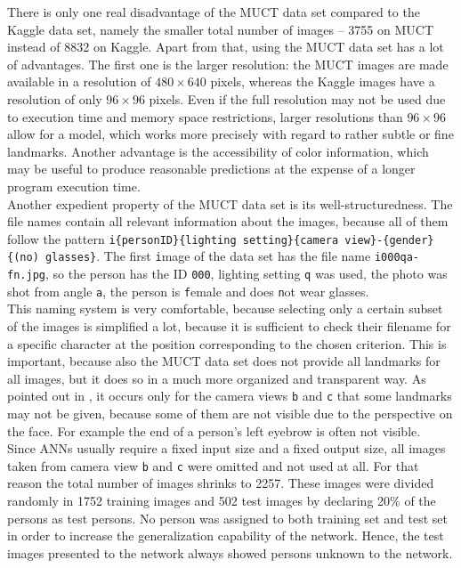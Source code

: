 \documentclass[11pt, a4paper]{article}
\begin{document}
There is only one real disadvantage of the \ac{MUCT} data set compared to the Kaggle data set, namely the smaller total number of images -- 3755 on \ac{MUCT} instead of 8832 on Kaggle. Apart from that, using the \ac{MUCT} data set has a lot of advantages. The first one is the larger resolution: the \ac{MUCT} images are made available in a resolution of $480 \times 640$ pixels, whereas the Kaggle images have a resolution of only $96 \times 96$ pixels. Even if the full resolution may not be used due to execution time and memory space restrictions, larger resolutions than $96 \times 96$ allow for a model, which works more precisely with regard to rather subtle or fine landmarks. Another advantage is the accessibility of color information, which may be useful to produce reasonable predictions at the expense of a longer program execution time.\\
Another expedient property of the \ac{MUCT} data set is its well-structuredness. The file names contain all relevant information about the images, because all of them follow the pattern \texttt{i\{personID\}\{lighting setting\}\{camera view\}-\{gender\}\{(no) glasses\}}. The first \texttt{i}mage of the data set has the file name \texttt{i000qa-fn.jpg}, so the person has the ID \texttt{000}, lighting setting \texttt{q} was used, the photo was shot from angle \texttt{a}, the person is \texttt{f}emale and does \texttt{n}ot wear glasses.\\
This naming system is very comfortable, because selecting only a certain subset of the images is simplified a lot, because it is sufficient to check their filename for a specific character at the position corresponding to the chosen criterion. This is important, because also the \ac{MUCT} data set does not provide all landmarks for all images, but it does so in a much more organized and transparent way. As pointed out in \cite{muct}, it occurs only for the camera views \texttt{b} and \texttt{c} that some landmarks may not be given, because some of them are not visible due to the perspective on the face. For example the end of a person's left eyebrow is often not visible.\\
Since \acp{ANN} usually require a fixed input size and a fixed output size, all images taken from camera view \texttt{b} and \texttt{c} were omitted and not used at all. For that reason the total number of images shrinks to 2257. These images were divided randomly in 1752 training images and 502 test images by declaring 20\% of the persons as test persons. No person was assigned to both training set and test set in order to increase the generalization capability of the network. Hence, the test images presented to the network always showed persons unknown to the network.
\end{document}
